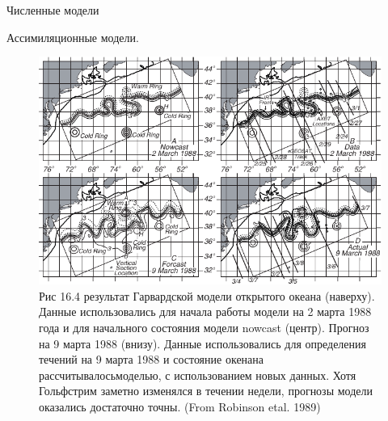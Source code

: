 \begin{chapter}{Численные модели}
\begin{section}{Ассимиляционные модели.}
\begin{figure}[t!]
\includegraphics{pics/harvardmodelR}
\caption{Рис 16.4 результат Гарвардской модели открытого океана
(наверху). Данные использовались для начала работы модели на 2 марта
1988 года и для начального состояния модели nowcast (центр). Прогноз
на 9 марта 1988 (внизу). Данные использовались для определения течений
на 9 марта 1988 и состояние окенана рассчитывалосьмоделью, с
использованием новых данных. Хотя Гольфстрим заметно изменялся в
течении недели, прогнозы модели оказались достаточно точны. (From
Robinson etal. 1989)}
\label{fig:harvardmodel}
\end{figure}
%


\end{section}
\end{chapter}

